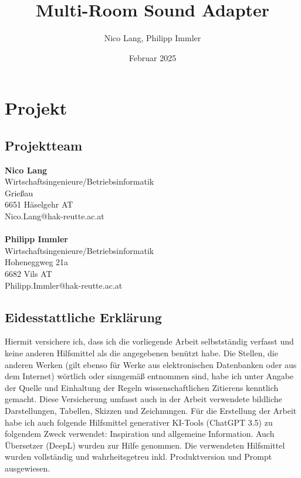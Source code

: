 \documentclass[11pt, twoside]{article}
\title{\textbf{Multi-Room Sound Adapter}}
\author{Nico Lang, Philipp Immler}
\date{Februar 2025}
\begin{document}




\section{Projekt}
\subsection{Projektteam}
\textbf{Nico Lang}\\
Wirtschaftsingenieure/Betriebsinformatik\\
Grießau\\
6651 Häselgehr AT\\
Nico.Lang@hak-reutte.ac.at\\
\\
\textbf{Philipp Immler}\\
Wirtschaftsingenieure/Betriebsinformatik\\
Hoheneggweg 21a\\
6682 Vils AT\\
Philipp.Immler@hak-reutte.ac.at

\pagebreak

\subsection{Eidesstattliche Erklärung}
Hiermit versichere ich, dass ich die vorliegende Arbeit selbstständig verfasst und keine anderen Hilfsmittel als die angegebenen benützt habe. Die Stellen, die anderen Werken (gilt ebenso für Werke aus elektronischen Datenbanken oder aus dem Internet) wörtlich oder sinngemäß entnommen sind, habe ich unter Angabe der Quelle und Einhaltung der Regeln wissenschaftlichen Zitierens kenntlich gemacht. Diese Versicherung umfasst auch in der Arbeit verwendete bildliche Darstellungen, Tabellen, Skizzen und Zeichnungen. Für die Erstellung der Arbeit habe ich auch folgende Hilfsmittel generativer KI-Tools (ChatGPT 3.5) zu folgendem Zweck verwendet: Inspiration und allgemeine Information. Auch Übersetzer (DeepL) wurden zur Hilfe genommen. Die verwendeten Hilfsmittel wurden vollständig und wahrheitsgetreu inkl. Produktversion und Prompt ausgewiesen.\\
\end{document}
